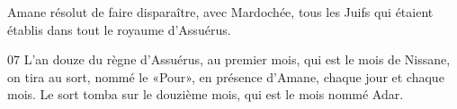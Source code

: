 Amane résolut de faire disparaître, avec Mardochée, tous les Juifs qui étaient établis dans tout le royaume d’Assuérus.

07 L’an douze du règne d’Assuérus, au premier mois, qui est le mois de Nissane, on tira au sort, nommé le «Pour», en présence d’Amane, chaque jour et chaque mois. Le sort tomba sur le douzième mois, qui est le mois nommé Adar.